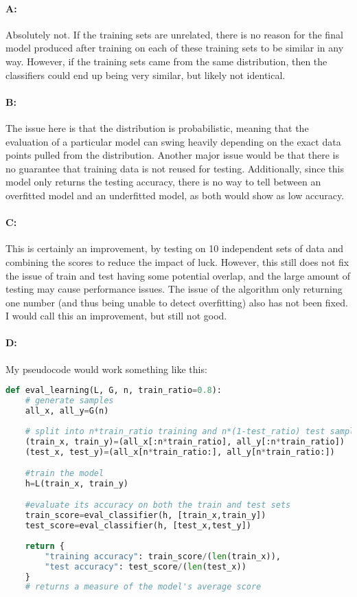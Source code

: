 \documentclass{article}
\begin{document}
\paragraph{A: } Absolutely not. If the training sets are unrelated, there is no reason for the final model produced after training on each of these training sets to be similar in any way. \newline
However, if the training sets came from the same distribution, then the classifiers could end up being very similar, but likely not identical.

\paragraph{B: } The issue here is that the distribution is probabilistic, meaning that the evaluation of a particular model can swing heavily depending on the exact data points pulled from the distribution. Another major issue would be that there is no guarantee that training data is not reused for testing. Additionally, since this model only returns the testing accuracy, there is no way to tell between an overfitted model and an underfitted model, as both would show as low accuracy.

\paragraph{C: } This is certainly an improvement, by testing on 10 independent sets of data and combining the scores to reduce the impact of luck. However, this still does not fix the issue of train and test having some potential overlap, and the large amount of testing may cause performance issues. The issue of the algorithm only returning one number (and thus being unable to detect overfitting) also has not been fixed. I would call this an improvement, but still not good.

\paragraph{D: } My pseudocode would work something like this: \newline
\begin{lstlisting}[language=Python]
def eval_learning(L, G, n, train_ratio=0.8):
    # generate samples
    all_x, all_y=G(n)
    
    # split into n*train_ratio training and n*(1-test_ratio) test samples
    (train_x, train_y)=(all_x[:n*train_ratio], all_y[:n*train_ratio])
    (test_x, test_y)=(all_x[n*train_ratio:], all_y[n*train_ratio:])

    #train the model
    h=L(train_x, train_y)

    #evaluate its accuracy on both the train and test sets
    train_score=eval_classifier(h, [train_x,train_y])
    test_score=eval_classifier(h, [test_x,test_y])
    
    return {
        "training accuracy": train_score/(len(train_x)),
        "test accuracy": test_score/(len(test_x))
    }
    # returns a measure of the model's average score
\end{lstlisting}
\end{document}
